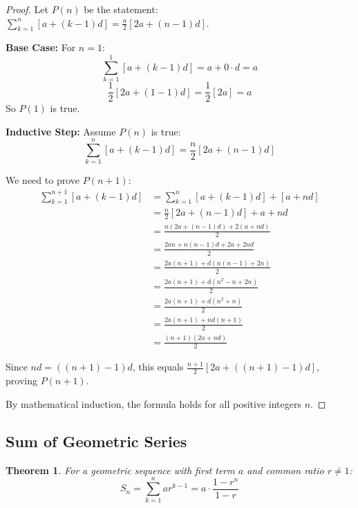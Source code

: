 \documentclass[12pt]{article}
\newtheorem{theorem}{Theorem}
\begin{document}
\begin{proof}
Let $P(n)$ be the statement: $\sum_{k=1}^{n} [a + (k-1)d] = \frac{n}{2}[2a + (n-1)d]$.

\textbf{Base Case:} For $n = 1$:
$$\sum_{k=1}^{1} [a + (k-1)d] = a + 0 \cdot d = a$$
$$\frac{1}{2}[2a + (1-1)d] = \frac{1}{2}[2a] = a$$
So $P(1)$ is true.

\textbf{Inductive Step:} Assume $P(n)$ is true:
$$\sum_{k=1}^{n} [a + (k-1)d] = \frac{n}{2}[2a + (n-1)d]$$

We need to prove $P(n+1)$:
\begin{align}
\sum_{k=1}^{n+1} [a + (k-1)d] &= \sum_{k=1}^{n} [a + (k-1)d] + [a + nd] \\
&= \frac{n}{2}[2a + (n-1)d] + a + nd \\
&= \frac{n(2a + (n-1)d) + 2(a + nd)}{2} \\
&= \frac{2an + n(n-1)d + 2a + 2nd}{2} \\
&= \frac{2a(n+1) + d(n(n-1) + 2n)}{2} \\
&= \frac{2a(n+1) + d(n^2-n+2n)}{2} \\
&= \frac{2a(n+1) + d(n^2+n)}{2} \\
&= \frac{2a(n+1) + nd(n+1)}{2} \\
&= \frac{(n+1)(2a + nd)}{2}
\end{align}

Since $nd = ((n+1)-1)d$, this equals $\frac{n+1}{2}[2a + ((n+1)-1)d]$, proving $P(n+1)$.

By mathematical induction, the formula holds for all positive integers $n$.
\end{proof}

\subsection{Sum of Geometric Series}

\begin{theorem}
For a geometric sequence with first term $a$ and common ratio $r \neq 1$:
$$S_n = \sum_{k=1}^{n} ar^{k-1} = a \cdot \frac{1-r^n}{1-r}$$
\end{theorem}
\end{document}

